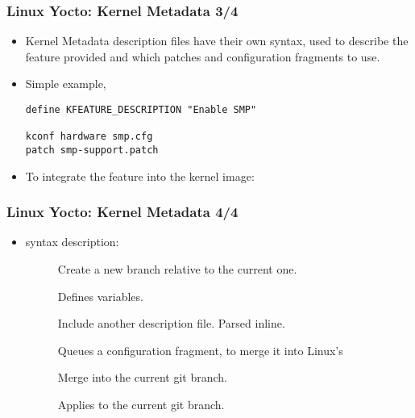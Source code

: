 \begin{frame}[fragile]
  \frametitle{Linux Yocto: Kernel Metadata 3/4}
  \begin{itemize}
    \item Kernel Metadata description files have their own syntax,
      used to describe the feature provided and which patches and
      configuration fragments to use.
    \item Simple example, 
      \begin{block}{}
        \begin{verbatim}
define KFEATURE_DESCRIPTION "Enable SMP"

kconf hardware smp.cfg
patch smp-support.patch
        \end{verbatim}
      \end{block}
    \item To integrate the feature into the kernel image:
  \end{itemize}
\end{frame}

\begin{frame}
  \frametitle{Linux Yocto: Kernel Metadata 4/4}
  \begin{itemize}
    \item {} syntax description:
      \begin{description}
        \item[] Create a new branch relative to the
          current one.
        \item[] Defines variables.
        \item[] Include another description
          file. Parsed inline.
        \item[] Queues
          a configuration fragment, to merge it into Linux's
        \item[] Merge  into the
          current git branch.
        \item[] Applies  to
          the current git branch.
      \end{description}
  \end{itemize}
\end{frame}
